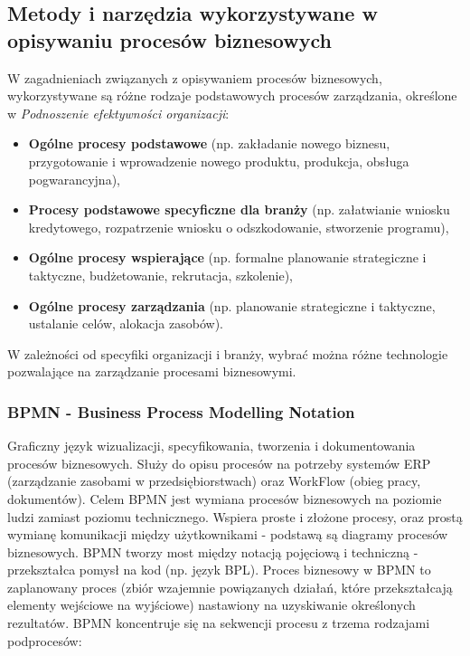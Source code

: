 \subsection{Metody i narzędzia wykorzystywane w opisywaniu procesów biznesowych}

W zagadnieniach związanych z opisywaniem procesów biznesowych, wykorzystywane są różne rodzaje podstawowych procesów zarządzania, określone w \textit{Podnoszenie efektywności organizacji}:

\begin{itemize}
	\item \textbf{Ogólne procesy podstawowe} (np. zakładanie nowego biznesu, przygotowanie i wprowadzenie nowego produktu, produkcja, obsługa pogwarancyjna),
	\item \textbf{Procesy podstawowe specyficzne dla branży} (np. załatwianie wniosku kredytowego, rozpatrzenie wniosku o odszkodowanie, stworzenie programu),
	\item \textbf{Ogólne procesy wspierające} (np. formalne planowanie strategiczne i taktyczne, budżetowanie, rekrutacja, szkolenie),
	\item \textbf{Ogólne procesy zarządzania} (np. planowanie strategiczne i taktyczne, ustalanie celów, alokacja zasobów).
\end{itemize}

W zależności od specyfiki organizacji i branży, wybrać można różne technologie pozwalające na zarządzanie procesami biznesowymi.


\subsubsection{BPMN - Business Process Modelling Notation}

Graficzny język wizualizacji, specyfikowania, tworzenia i dokumentowania procesów biznesowych. Służy do opisu procesów na potrzeby systemów ERP (zarządzanie zasobami w przedsiębiorstwach) oraz WorkFlow (obieg pracy, dokumentów). Celem BPMN jest wymiana procesów biznesowych na poziomie ludzi zamiast poziomu technicznego. Wspiera proste i złożone procesy, oraz prostą wymianę komunikacji między użytkownikami - podstawą są diagramy procesów biznesowych. BPMN tworzy most między notacją pojęciową i techniczną - przekształca pomysł na kod (np. język BPL). Proces biznesowy w BPMN to zaplanowany proces (zbiór wzajemnie powiązanych działań, które przekształcają elementy wejściowe na wyjściowe) nastawiony na uzyskiwanie określonych rezultatów. BPMN koncentruje się na sekwencji procesu z trzema rodzajami podprocesów:

